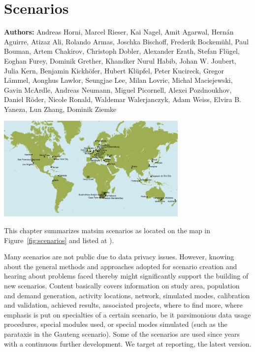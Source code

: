 \chapter{Scenarios}
\label{ch:scenarios}

\hfill \textbf{Authors:} 
Andreas Horni, 
Marcel Rieser, 
Kai Nagel,
Amit Agarwal,
Hernán Aguirre,
Atizaz Ali,
Rolando Armas,
Joschka Bischoff,
Frederik Bockemühl,
Paul Bouman,
Artem Chakirov,
Christoph Dobler,
Alexander Erath,
Stefan Flügel, 
Eoghan Furey,
Dominik Grether,
Khandker Nurul Habib,
Johan W. Joubert,
Julia Kern,
Benjamin Kickhöfer,
Hubert Klüpfel,
Peter Kucireck,
Gregor Lämmel,
Aonghus Lawlor,
Seungjae Lee,
Milan Lovric,
Michal Maciejewski,
Gavin McArdle,
Andreas Neumann,
Miguel Picornell,
Alexei Pozdnoukhov,
Daniel Röder,
Nicole Ronald,
Waldemar Walerjanczyk,
Adam Weiss,
Elvira B. Yaneza,
Lun Zhang,
Dominik Ziemke

\begin{center} \includegraphics[width=0.7\textwidth, angle=0]{using/figures/MATSimModelsMap} \end{center}

This chapter summarizes \gls{matsim} scenarios as located on the map in Figure~\ref{fig:scenarios} and listed at \citet[][]{MATSIM-Scenarios_Webpage_2015}).

Many scenarios are not public due to data privacy issues. However, knowing about the general methods and approaches adopted for scenario creation and hearing about problems faced thereby might significantly support the building of new scenarios. Content basically covers information on study area, population and demand generation, activity locations, network, simulated modes, calibration and validation, achieved results, associated projects, where to find more, where emphasis is put on specialties of a certain scenario, be it parsimonious data usage procedures, special modules used, or special modes simulated (such as the parataxis in the Gauteng scenario). Some of the scenarios are used since years with a continuous further development. We target at reporting, the latest version. 

